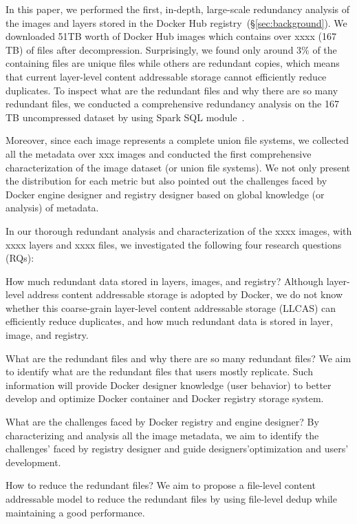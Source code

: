 In this paper, we performed the first, in-depth, large-scale redundancy
analysis of the images and layers stored in the Docker Hub
registry~(\S\ref{sec:background}).
%
We downloaded 51TB worth of Docker Hub images which contains over xxxx (167 TB)
of files after decompression.
%
Surprisingly, we found only around 3\% of the containing files are unique files
while others are redundant copies, which means that current layer-level content
addressable storage cannot efficiently reduce duplicates.
%
To inspect what are the redundant files and why there are so many redundant
files, we conducted a comprehensive redundancy analysis on the 167 TB
uncompressed dataset by using Spark SQL module~\cite{xxxx}.

Moreover, since each image represents a complete union file systems, we
collected all the metadata over xxx images and  conducted the first
comprehensive characterization of the image dataset (or union file systems).
%
We not only present the distribution for each metric but also pointed out the
challenges faced by Docker engine designer and registry designer based on
global knowledge (or analysis) of metadata.

In our thorough redundant analysis and characterization of the xxxx images,
with xxxx layers and xxxx files, we investigated the following four research
questions (RQs):
%
\begin{compactitemize}
%
\item How much redundant data stored in layers, images, and registry? Although
layer-level address content addressable storage is adopted by Docker, we do not
know whether  this coarse-grain layer-level content addressable storage (LLCAS)
can efficiently reduce duplicates, and how much redundant data is stored in
layer, image, and registry.
%
\item What are the redundant files and why there are so many redundant files?
We aim to identify what are the redundant files that users mostly replicate.
%
Such information will provide Docker designer knowledge (user behavior) to
better develop and optimize Docker container and Docker registry storage
system.
%
\item What are the challenges faced by Docker registry and engine designer? By
characterizing and analysis all the image metadata, we aim to identify the
challenges' faced by registry designer and guide designers'optimization and
users' development.
%
\item How to reduce the redundant files? We aim to propose a file-level content
addressable model to reduce the redundant files by using file-level dedup while
maintaining a good performance.
%
\end{compactitemize}

